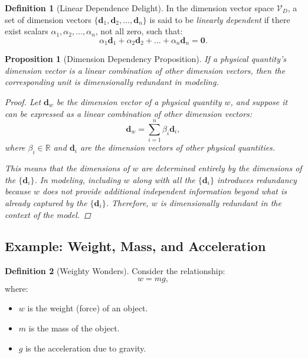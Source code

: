 \documentclass{article}
\newtheorem{proposition}{Proposition}[section]
\theoremstyle{definition}
\newtheorem{definition}{Definition}[section]
\theoremstyle{remark}
\begin{document}
	\begin{definition}[Linear Dependence Delight]
		In the dimension vector space $\mathcal{V}_D$, a set of dimension vectors $\{ \mathbf{d}_1, \mathbf{d}_2, \dots, \mathbf{d}_n \}$ is said to be \emph{linearly dependent} if there exist scalars $\alpha_1, \alpha_2, \dots, \alpha_n$, not all zero, such that:
		\[
		\alpha_1 \mathbf{d}_1 + \alpha_2 \mathbf{d}_2 + \dots + \alpha_n \mathbf{d}_n = \mathbf{0}.
		\]
	\end{definition}
	
	\begin{proposition}[Dimension Dependency Proposition]
		If a physical quantity's dimension vector is a linear combination of other dimension vectors, then the corresponding unit is \emph{dimensionally redundant} in modeling.
		
		\begin{proof}
			Let $\mathbf{d}_w$ be the dimension vector of a physical quantity $w$, and suppose it can be expressed as a linear combination of other dimension vectors:
			\[
			\mathbf{d}_w = \sum_{i=1}^{n} \beta_i \mathbf{d}_i,
			\]
			where $\beta_i \in \mathbb{R}$ and $\mathbf{d}_i$ are the dimension vectors of other physical quantities.
			
			This means that the dimensions of $w$ are determined entirely by the dimensions of the $\{ \mathbf{d}_i \}$. In modeling, including $w$ along with all the $\{ \mathbf{d}_i \}$ introduces redundancy because $w$ does not provide additional independent information beyond what is already captured by the $\{ \mathbf{d}_i \}$. Therefore, $w$ is dimensionally redundant in the context of the model.
		\end{proof}
	\end{proposition}
	
	\subsection{Example: Weight, Mass, and Acceleration}
	
	\begin{definition}[Weighty Wonders]
		Consider the relationship:
		\[
		w = m g,
		\]
		where:
		\begin{itemize}
			\item $w$ is the weight (force) of an object.
			\item $m$ is the mass of the object.
			\item $g$ is the acceleration due to gravity.
		\end{itemize}
	\end{definition}
	
\end{document}
